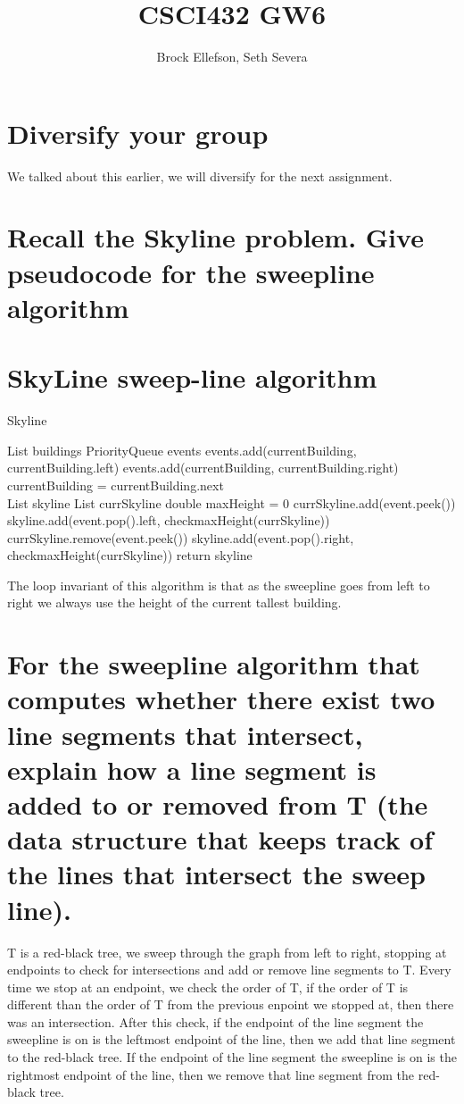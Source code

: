\documentclass[10pt,a4paper]{article}
\author{Brock Ellefson, Seth Severa}
\title{CSCI432 GW6}
\begin{document}
\maketitle
\section{Diversify your group}
We talked about this earlier, we will diversify for the next assignment.
\section{Recall the Skyline problem. Give pseudocode for the sweepline algorithm}
\section*{SkyLine sweep-line algorithm}
\begin{algorithm}
\caption{Skyline}\label{euclid}
\begin{algorithmic}[1]

\State List buildings
\State PriorityQueue events
\State events.add(currentBuilding, currentBuilding.left)
\State events.add(currentBuilding, currentBuilding.right)
\State currentBuilding = currentBuilding.next
\EndWhile \\
\State List skyline
\State List currSkyline
\State double maxHeight = 0
    \State currSkyline.add(event.peek())
    skyline.add(event.pop().left, checkmaxHeight(currSkyline))
    \EndIf
\Else
    \State currSkyline.remove(event.peek())
    skyline.add(event.pop().right, checkmaxHeight(currSkyline))
    \EndIf
\EndIf
\EndWhile
\State return skyline
\end{algorithmic}
\end{algorithm}
The loop invariant of this algorithm is that as the sweepline goes from left to right we always use the height of the current tallest building. 
\section{For the sweepline algorithm that computes whether there exist two line segments that intersect, explain how a line segment is added to or removed from T (the data structure that keeps track of the lines that intersect the sweep line).}
T is a red-black tree, we sweep through the graph from left to right, stopping at endpoints to check for intersections and add or remove line segments to T. Every time we stop at an endpoint, we check the order of T, if the order of T is different than the order of T from the previous enpoint we stopped at, then there was an intersection. After this check, if the endpoint of the line segment the sweepline is on is the leftmost endpoint of the line, then we add that line segment to the red-black tree. If the endpoint of the line segment the sweepline is on is the rightmost endpoint of the line, then we remove that line segment from the red-black tree.
\end{document}
